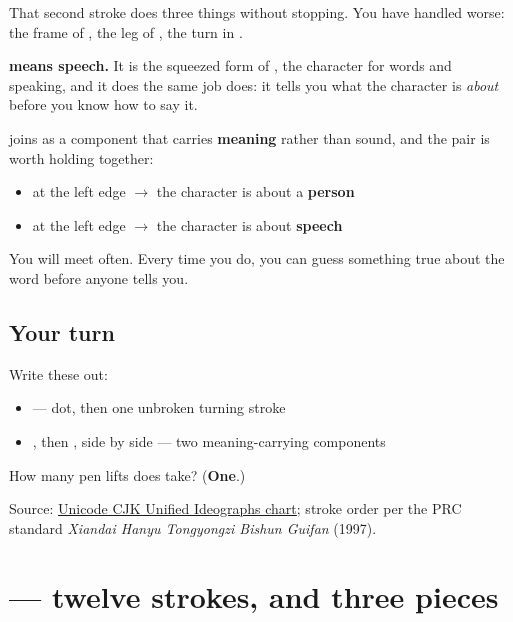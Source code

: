 That second stroke does three things without stopping. You have handled worse: the frame of , the leg of , the turn in .

\textbf{ means speech.} It is the squeezed form of , the character for words and speaking, and it does the same job  does: it tells you what the character is \emph{about} before you know how to say it.

 joins  as a component that carries \textbf{meaning} rather than sound, and the pair is worth holding together:

\begin{itemize}
\raggedright
  \item \textbf{} at the left edge $\to$ the character is about a \textbf{person}
  \item \textbf{} at the left edge $\to$ the character is about \textbf{speech}
\end{itemize}

You will meet  often. Every time you do, you can guess something true about the word before anyone tells you.

\subsection*{Your turn}
Write these out:

\begin{itemize}
\raggedright
  \item {} — dot, then one unbroken turning stroke
  \item {}, then , side by side — two meaning-carrying components
\end{itemize}

\begin{tcolorbox}[breakable,colback=teal!4,colframe=teal!35!black,title={Before you move on}]
How many pen lifts does  take? (\textbf{One}.)

Source: \href{https://www.unicode.org/charts/PDF/U4E00.pdf}{Unicode CJK Unified Ideographs chart}; stroke order per the PRC standard \emph{Xiandai Hanyu Tongyongzi Bishun Guifan} (1997).
\end{tcolorbox}
\section[\texorpdfstring{\zh{谢} (xiè)}{谢 (xiè)}]{ — twelve strokes, and three pieces}

\label{lesson:ZH-W10-xie}



